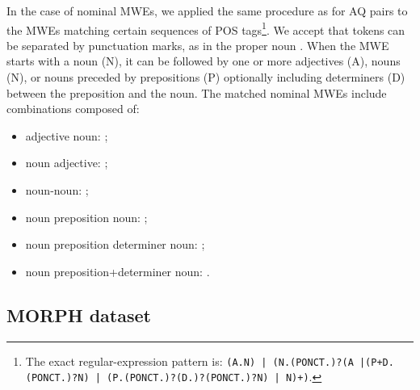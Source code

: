 \documentclass[output=paper,
modfonts
]{langscibook}
\begin{document}
In the case of nominal MWEs, we applied the same procedure as for AQ pairs to the MWEs matching certain sequences of POS tags\footnote{The exact regular-expression pattern is: \texttt{(A.N) | (N.(PONCT.)?(A |(P+D.(PONCT.)?N) | (P.(PONCT.)?(D.)?(PONCT.)?N) | N)+)}.}. We accept that tokens can be separated by punctuation marks, as in the proper noun . When the MWE starts with a noun (N), it can be followed by one or more adjectives (A), nouns (N), or nouns preceded by prepositions (P) optionally including determiners (D) between the preposition and the noun.
The matched nominal MWEs include combinations composed of: 
\begin{itemize}
\item adjective noun: ;
\item noun adjective: ;
\item noun-noun: ;
\item noun preposition noun: ;
\item noun preposition determiner noun: ;
\item noun preposition+determiner noun: .
\end{itemize}



\subsection{MORPH dataset} %
\label{subsec:morph}
\end{document}
